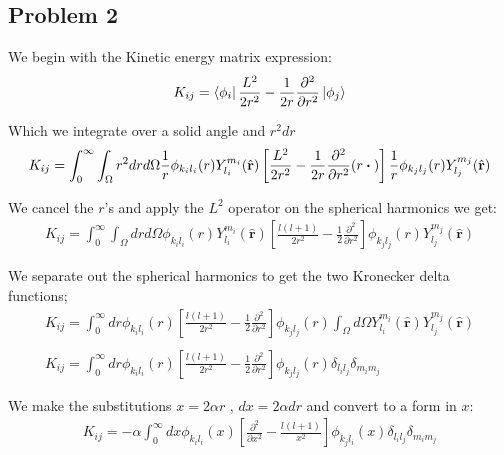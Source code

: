 \documentclass{article}
\renewcommand{\vec}[1]{\mathbf{#1}}
\let\oldhat\hat
\renewcommand{\hat}[1]{\oldhat{\mathbf{#1}}}
\begin{document}
    
    \subsection{Problem 2}
    
    We begin with the Kinetic energy matrix expression:
    \large
    \begin{gather}
    	K_{ij} = \bra{\phi_i} \frac{L^2}{2r^2} -\frac{1}{2r}\frac{\partial^2}{\partial r^2} \ket{\phi_j}
    \end{gather}
    \normalsize
    
    Which we integrate over a solid angle and $r^2dr$
    \large
    \begin{gather}
    	K_{ij} = \int_{0}^{\infty}\int_{\Omega} r^2drd\Omega \frac{1}{r}\phi_{k_il_i}(r)Y^{m_i}_{l_i} (\hat{\vec{r}}) \left[ \frac{L^2}{2r^2} -\frac{1}{2r}\frac{\partial^2}{\partial r^2}(r\dotproduct{}) \right] \frac{1}{r}\phi_{k_jl_j}(r)Y^{m_j}_{l_j}(\hat{\vec{r}})
    \end{gather}
    \normalsize
    
    We cancel the $r$'s and apply the $L^2$ operator on the spherical harmonics we get:
    \large
    \begin{gather}
    	K_{ij} = \int_{0}^{\infty}\int_{\Omega} drd\Omega \phi_{k_il_i}(r)Y^{m_i}_{l_i} (\hat{\vec{r}}) \left[ \frac{l(l+1)}{2r^2} -\frac{1}{2}\frac{\partial^2}{\partial r^2} \right] \phi_{k_jl_j}(r)Y^{m_j}_{l_j}(\hat{\vec{r}})
    \end{gather}
    \normalsize
    
    We separate out the spherical harmonics to get the two Kronecker delta functions;
    \large
    \begin{gather}
    	K_{ij} = \int_{0}^{\infty} dr \phi_{k_il_i}(r) \left[ \frac{l(l+1)}{2r^2} -\frac{1}{2}\frac{\partial^2}{\partial r^2} \right] \phi_{k_jl_j}(r) \int_{\Omega}d\Omega Y^{m_i}_{l_i}(\hat{\vec{r}})Y^{m_j}_{l_j}(\hat{\vec{r}})\\
    	\\
    	K_{ij} = \int_{0}^{\infty} dr \phi_{k_il_i}(r) \left[ \frac{l(l+1)}{2r^2} -\frac{1}{2}\frac{\partial^2}{\partial r^2} \right] \phi_{k_jl_j}(r) \delta_{l_il_j} \delta_{m_im_j}
    \end{gather}
    \normalsize
    
    We make the substitutions $x=2\alpha r$ , $dx=2\alpha dr$ and convert to a form in $x$:
    \large
    \begin{gather}
    	K_{ij} = -\alpha\int_{0}^{\infty} dx \phi_{k_il_i}(x) \left[\frac{\partial^2}{\partial x^2} -\frac{l(l+1)}{x^2}\right] \phi_{k_jl_i}(x) \delta_{l_il_j} \delta_{m_im_j}\\
    \end{gather}
    \normalsize
    
\end{document}
